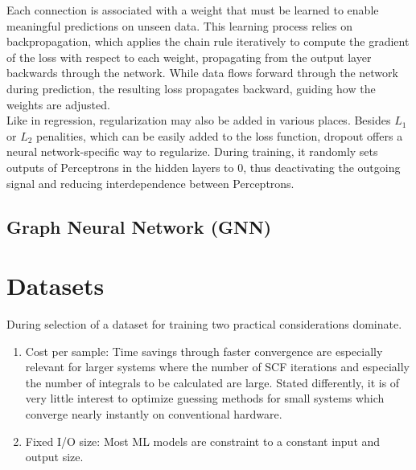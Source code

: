 Each connection is associated with a weight that must be learned to enable meaningful predictions on unseen data. This learning process relies on backpropagation, which applies the chain rule iteratively to compute the gradient of the loss with respect to each weight, propagating from the output layer backwards through the network. While data flows forward through the network during prediction, the resulting loss propagates backward, guiding how the weights are adjusted. \\

Like in regression, regularization may also be added in various places. Besides $L_1$ or $L_2$ penalities, which can be easily added to the loss function, dropout offers a neural network-specific way to regularize. During training, it randomly sets outputs of Perceptrons in the hidden layers to 0, thus deactivating the outgoing signal and reducing interdependence between Perceptrons. 

\subsection{Graph Neural Network (GNN)}
\label{subsec:background_gnn}


\section{Datasets}
\label{sec:datasets}
During selection of a dataset for training two practical considerations dominate. 
\begin{enumerate}
    \item Cost per sample: Time savings through faster convergence are especially relevant for larger systems where the number of SCF iterations and especially the number of integrals to be calculated are large. Stated differently, it is of very little interest to optimize guessing methods for small systems which converge nearly instantly on conventional hardware. 
    \item Fixed I/O size: Most ML models are constraint to a constant input and output size. 
\end{enumerate}

